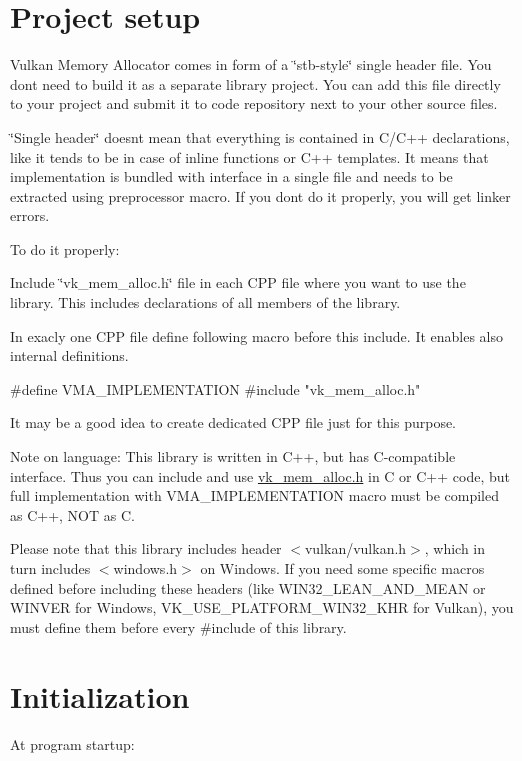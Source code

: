 \hypertarget{quick_start_quick_start_project_setup}{}\section{Project setup}\label{quick_start_quick_start_project_setup}
Vulkan Memory Allocator comes in form of a \char`\"{}stb-\/style\char`\"{} single header file. You don\textquotesingle{}t need to build it as a separate library project. You can add this file directly to your project and submit it to code repository next to your other source files.

\char`\"{}\+Single header\char`\"{} doesn\textquotesingle{}t mean that everything is contained in C/\+C++ declarations, like it tends to be in case of inline functions or C++ templates. It means that implementation is bundled with interface in a single file and needs to be extracted using preprocessor macro. If you don\textquotesingle{}t do it properly, you will get linker errors.

To do it properly\+:


\begin{DoxyEnumerate}
\item Include \char`\"{}vk\+\_\+mem\+\_\+alloc.\+h\char`\"{} file in each C\+PP file where you want to use the library. This includes declarations of all members of the library.
\item In exacly one C\+PP file define following macro before this include. It enables also internal definitions.
\end{DoxyEnumerate}


\begin{DoxyCode}
\textcolor{preprocessor}{#define VMA\_IMPLEMENTATION}
\textcolor{preprocessor}{#include "vk\_mem\_alloc.h"}
\end{DoxyCode}


It may be a good idea to create dedicated C\+PP file just for this purpose.

Note on language\+: This library is written in C++, but has C-\/compatible interface. Thus you can include and use \hyperlink{vk__mem__alloc_8h_source}{vk\+\_\+mem\+\_\+alloc.\+h} in C or C++ code, but full implementation with {\ttfamily V\+M\+A\+\_\+\+I\+M\+P\+L\+E\+M\+E\+N\+T\+A\+T\+I\+ON} macro must be compiled as C++, N\+OT as C.

Please note that this library includes header {\ttfamily $<$vulkan/vulkan.\+h$>$}, which in turn includes {\ttfamily $<$windows.\+h$>$} on Windows. If you need some specific macros defined before including these headers (like {\ttfamily W\+I\+N32\+\_\+\+L\+E\+A\+N\+\_\+\+A\+N\+D\+\_\+\+M\+E\+AN} or {\ttfamily W\+I\+N\+V\+ER} for Windows, {\ttfamily V\+K\+\_\+\+U\+S\+E\+\_\+\+P\+L\+A\+T\+F\+O\+R\+M\+\_\+\+W\+I\+N32\+\_\+\+K\+HR} for Vulkan), you must define them before every {\ttfamily \#include} of this library.\hypertarget{quick_start_quick_start_initialization}{}\section{Initialization}\label{quick_start_quick_start_initialization}
At program startup\+:


